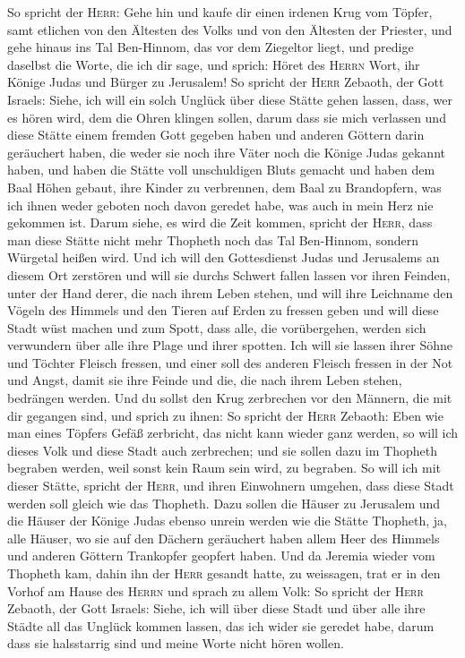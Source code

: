  So spricht der \textsc{Herr}: Gehe hin und kaufe dir
einen irdenen Krug vom Töpfer, samt etlichen von den Ältesten des Volks
und von den Ältesten der Priester,  und gehe hinaus ins
Tal Ben-Hinnom, das vor dem Ziegeltor liegt, und predige daselbst die
Worte, die ich dir sage,  und sprich: Höret des
\textsc{Herrn} Wort, ihr Könige Judas und Bürger zu Jerusalem! So
spricht der \textsc{Herr} Zebaoth, der Gott Israels: Siehe, ich will ein
solch Unglück über diese Stätte gehen lassen, dass, wer es hören wird,
dem die Ohren klingen sollen,  darum dass sie mich
verlassen und diese Stätte einem fremden Gott gegeben haben und anderen
Göttern darin geräuchert haben, die weder sie noch ihre Väter noch die
Könige Judas gekannt haben, und haben die Stätte voll unschuldigen Bluts
gemacht  und haben dem Baal Höhen gebaut, ihre Kinder zu
verbrennen, dem Baal zu Brandopfern, was ich ihnen weder geboten noch
davon geredet habe, was auch in mein Herz nie gekommen ist.
 Darum siehe, es wird die Zeit kommen, spricht der
\textsc{Herr}, dass man diese Stätte nicht mehr Thopheth noch das Tal
Ben-Hinnom, sondern Würgetal heißen wird.  Und ich will
den Gottesdienst Judas und Jerusalems an diesem Ort zerstören und will
sie durchs Schwert fallen lassen vor ihren Feinden, unter der Hand
derer, die nach ihrem Leben stehen, und will ihre Leichname den Vögeln
des Himmels und den Tieren auf Erden zu fressen geben  und
will diese Stadt wüst machen und zum Spott, dass alle, die vorübergehen,
werden sich verwundern über alle ihre Plage und ihrer spotten.
 Ich will sie lassen ihrer Söhne und Töchter Fleisch
fressen, und einer soll des anderen Fleisch fressen in der Not und
Angst, damit sie ihre Feinde und die, die nach ihrem Leben stehen,
bedrängen werden.  Und du sollst den Krug zerbrechen vor
den Männern, die mit dir gegangen sind,  und sprich zu
ihnen: So spricht der \textsc{Herr} Zebaoth: Eben wie man eines Töpfers
Gefäß zerbricht, das nicht kann wieder ganz werden, so will ich dieses
Volk und diese Stadt auch zerbrechen; und sie sollen dazu im Thopheth
begraben werden, weil sonst kein Raum sein wird, zu begraben.
 So will ich mit dieser Stätte, spricht der
\textsc{Herr}, und ihren Einwohnern umgehen, dass diese Stadt werden
soll gleich wie das Thopheth.  Dazu sollen die Häuser zu
Jerusalem und die Häuser der Könige Judas ebenso unrein werden wie die
Stätte Thopheth, ja, alle Häuser, wo sie auf den Dächern geräuchert
haben allem Heer des Himmels und anderen Göttern Trankopfer geopfert
haben.  Und da Jeremia wieder vom Thopheth kam, dahin ihn
der \textsc{Herr} gesandt hatte, zu weissagen, trat er in den Vorhof am
Hause des \textsc{Herrn} und sprach zu allem Volk:  So
spricht der \textsc{Herr} Zebaoth, der Gott Israels: Siehe, ich will
über diese Stadt und über alle ihre Städte all das Unglück kommen
lassen, das ich wider sie geredet habe, darum dass sie halsstarrig sind
und meine Worte nicht hören wollen.

